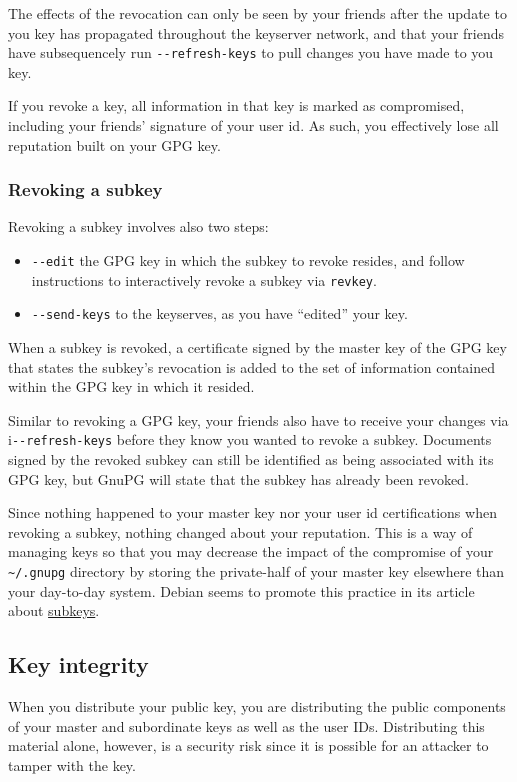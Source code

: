 The effects of the revocation can only be seen by your friends after the update
 to you key has propagated throughout the keyserver network, and that your
 friends have subsequencely run \verb+--refresh-keys+ to pull changes you have
 made to you key.

If you revoke a key, all information in that key is marked as compromised,
including your friends’ signature of your user id. As such, you effectively
lose all reputation built on your GPG key.

\subsubsection{Revoking a subkey}
Revoking a subkey involves also two steps:
\begin{itemize}
    \item \verb+--edit+ the GPG key in which the subkey to revoke resides, and
        follow instructions to interactively revoke a subkey via \verb+revkey+.
    \item \verb+--send-keys+ to the keyserves, as you have “edited” your key.
\end{itemize}

When a subkey is revoked, a certificate signed by the master key of the GPG key
that states the subkey’s revocation is added to the set of information
contained within the GPG key in which it resided.

Similar to revoking a GPG key, your friends also have to receive your changes
via i\verb+--refresh-keys+ before they know you wanted to revoke a subkey.
Documents signed by the revoked subkey can still be identified as being
associated with its GPG key, but GnuPG will state that the subkey has already
been revoked.

Since nothing happened to your master key nor your user id certifications when
revoking a subkey, nothing changed about your reputation. This is a way of
managing keys so that you may decrease the impact of the compromise of your
\verb+~/.gnupg+ directory by storing the private-half of your master key
elsewhere than your day-to-day system. Debian seems to promote this practice in
its article about \href{https://wiki.debian.org/Subkeys}{subkeys}.

\subsection{Key integrity}

When you distribute your public key, you are distributing the public components
of your master and subordinate keys as well as the user IDs. Distributing this
material alone, however, is a security risk since it is possible for an
attacker to tamper with the key.

